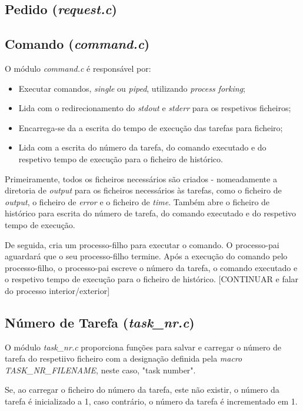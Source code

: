 \documentclass[a4paper,11pt]{scrreprt}
\begin{document}
        \subsection{Pedido (\textit{request.c})}

        \subsection{Comando (\textit{command.c})}
        O módulo \textit{command.c} é responsável por:
        \begin{itemize}
            \item Executar comandos, \textit{single} ou \textit{piped}, utilizando \textit{process forking};
            \item Lida com o redirecionamento do \textit{stdout} e \textit{stderr} para os respetivos ficheiros;
            \item Encarrega-se da a escrita do tempo de execução das tarefas para ficheiro;
            \item Lida com a escrita do número da tarefa, do comando executado e do respetivo tempo de execução para o ficheiro de histórico.
        \end{itemize}

        Primeiramente, todos os ficheiros necessários são criados - nomeadamente a diretoria de \textit{output} para os ficheiros necessários às tarefas, como o ficheiro de \textit{output}, o ficheiro de \textit{error} e o ficheiro de \textit{time}. Também abre o ficheiro de histórico para escrita do número de  tarefa, do comando executado e do respetivo tempo de execução.

        De seguida, cria um processo-filho para executar o comando. O processo-pai aguardará que o seu processo-filho termine. Após a execução do comando pelo processo-filho, o processo-pai escreve o número da tarefa, o comando executado e o respetivo tempo de execução para o ficheiro de histórico. [CONTINUAR e falar do processo interior/exterior]


        \subsection{Número de Tarefa (\textit{task\_nr.c})}
        O módulo \textit{task\_nr.c} proporciona funções para salvar e carregar o número de tarefa do respetiivo ficheiro com a designação definida pela \textit{macro TASK\_NR\_FILENAME}, neste caso, "task number".

        Se, ao carregar o ficheiro do número da tarefa, este não existir, o número da tarefa é inicializado a 1, caso contrário, o número da tarefa é incrementado em 1.
\end{document}
